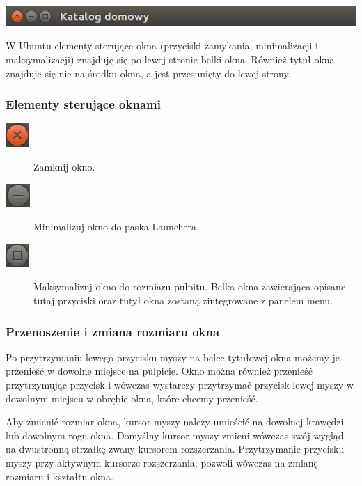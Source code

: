 \begin{center}
	\vspace{-10pt}
	\includegraphics[width=\linewidth]{images/unity_okno_belka.png}
\end{center}

W Ubuntu elementy sterujące okna (przyciski zamykania, minimalizacji i maksymalizacji) znajduję się po lewej stronie belki okna. Również tytuł okna znajduje się nie na środku okna, a jest przesunięty do lewej strony.

\subsubsection{Elementy sterujące oknami}
\begin{description}
\item[\includegraphics{images/unity_okno_exit.png}] Zamknij okno.
\item[\includegraphics{images/unity_okno_min.png}] Minimalizuj okno do paska Launchera.
\item[\includegraphics{images/unity_okno_max.png}] Maksymalizuj okno do rozmiaru pulpitu. Belka okna zawierająca opisane tutaj przyciski oraz tutył okna zostaną zintegrowane z panelem menu.
\end{description}

\subsubsection{Przenoszenie i zmiana rozmiaru okna}
Po przytrzymaniu lewego przycisku myszy na belce tytułowej okna możemy je przenieść w dowolne miejsce na pulpicie. Okno można również przenieść przytrzymując przycisk  i wówczas wystarczy przytrzymać przycisk lewej myszy w dowolnym miejscu w obrębie okna, które chcemy przenieść.

Aby zmienić rozmiar okna, kursor myszy należy umieścić na dowolnej krawędzi lub dowolnym rogu okna. Domyślny kursor myszy zmieni wówczas swój wygląd na dwustronną strzałkę zwany kursorem rozszerzania. Przytrzymanie przycisku myszy przy aktywnym kursorze rozszerzania, pozwoli wówczas na zmianę rozmiaru i kształtu okna.

